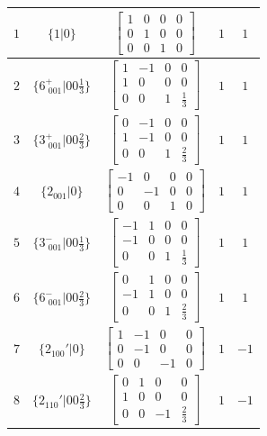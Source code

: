\documentclass[fleqn,8pt]{jsarticle}
\begin{document}
\begin{longtable}{ccccc}
$ 1 $ & $ \{1|0\} $ & $ \begin{bmatrix} 1 & 0 & 0 & 0 \\ 0 & 1 & 0 & 0 \\ 0 & 0 & 1 & 0 \end{bmatrix} $ & $ 1 $ & $ 1 $ \\ \hline
$ 2 $ & $ \{6^{+}_{\,\,001}|0 0 \frac{1}{3}\} $ & $ \begin{bmatrix} 1 & -1 & 0 & 0 \\ 1 & 0 & 0 & 0 \\ 0 & 0 & 1 & \frac{1}{3} \end{bmatrix} $ & $ 1 $ & $ 1 $ \\ \hline
$ 3 $ & $ \{3^{+}_{\,\,001}|0 0 \frac{2}{3}\} $ & $ \begin{bmatrix} 0 & -1 & 0 & 0 \\ 1 & -1 & 0 & 0 \\ 0 & 0 & 1 & \frac{2}{3} \end{bmatrix} $ & $ 1 $ & $ 1 $ \\ \hline
$ 4 $ & $ \{2{}_{001}|0\} $ & $ \begin{bmatrix} -1 & 0 & 0 & 0 \\ 0 & -1 & 0 & 0 \\ 0 & 0 & 1 & 0 \end{bmatrix} $ & $ 1 $ & $ 1 $ \\ \hline
$ 5 $ & $ \{3^{-}_{\,\,001}|0 0 \frac{1}{3}\} $ & $ \begin{bmatrix} -1 & 1 & 0 & 0 \\ -1 & 0 & 0 & 0 \\ 0 & 0 & 1 & \frac{1}{3} \end{bmatrix} $ & $ 1 $ & $ 1 $ \\ \hline
$ 6 $ & $ \{6^{-}_{\,\,001}|0 0 \frac{2}{3}\} $ & $ \begin{bmatrix} 0 & 1 & 0 & 0 \\ -1 & 1 & 0 & 0 \\ 0 & 0 & 1 & \frac{2}{3} \end{bmatrix} $ & $ 1 $ & $ 1 $ \\ \hline
$ 7 $ & $ \{2{}_{100}{}'|0\} $ & $ \begin{bmatrix} 1 & -1 & 0 & 0 \\ 0 & -1 & 0 & 0 \\ 0 & 0 & -1 & 0 \end{bmatrix} $ & $ 1 $ & $ -1 $ \\ \hline
$ 8 $ & $ \{2{}_{110}{}'|0 0 \frac{2}{3}\} $ & $ \begin{bmatrix} 0 & 1 & 0 & 0 \\ 1 & 0 & 0 & 0 \\ 0 & 0 & -1 & \frac{2}{3} \end{bmatrix} $ & $ 1 $ & $ -1 $ \\ \hline

\end{longtable}
\end{document}
